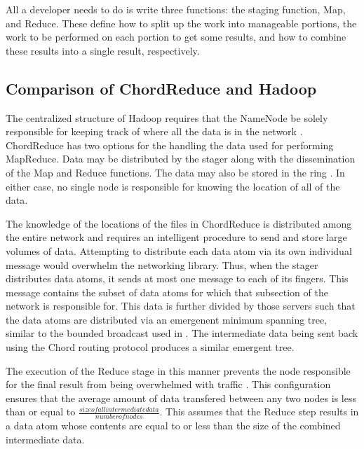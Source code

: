 \documentclass[10pt, conference, compsocconf]{IEEEtran}
\begin{document}
All a developer needs to do is write three functions: the staging function, Map, and Reduce.  These define how to split up the work into manageable portions, the work to be performed on each portion to get some results, and how to combine these results into a single result, respectively. 


\subsection{Comparison of ChordReduce and Hadoop}

The centralized structure of Hadoop requires that the NameNode be solely responsible for keeping track of where all the data is in the network \cite{Hadoop}.  ChordReduce has two options for the handling the data used for performing MapReduce.  Data may be distributed by the stager along with the dissemination of the Map and Reduce functions.  The data may also be stored in the ring \cite{CFS}.  In either case, no single node is responsible for knowing the location of all of the data.  

The knowledge of the locations of the files in ChordReduce is distributed among the entire network and requires an intelligent procedure to send and store large volumes of data.  Attempting to distribute each data atom via its own individual message would overwhelm the networking library. Thus, when the stager distributes data atoms, it sends at most one message to each of its fingers.  This message contains the subset of data atoms for which that subsection of the network is responsible for.  This data is further divided by those servers such that the data atoms are distributed via an emergenent minimum spanning tree, similar to the bounded broadcast used in \cite{leemap}.  The intermediate data being sent back using the Chord routing protocol produces a similar emergent tree. 

The execution of the Reduce stage in this manner prevents the node responsible for the final result from being overwhelmed with traffic \cite{hadoop-bottle}.  This configuration ensures that the average amount of data transfered between any two nodes is less than or equal to $\frac{size of all intermediate data}{number of nodes}$.  This assumes that the Reduce step results in a data atom whose contents are equal to or less than the size of the combined intermediate data.  
\end{document}
